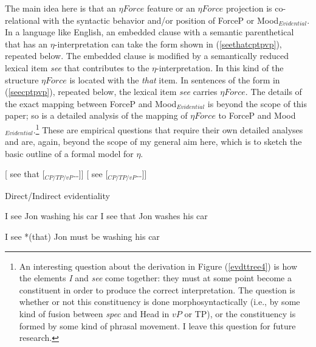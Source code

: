 \documentclass{article}
\begin{document}
The main idea here is that an $\eta Force$ feature or an $\eta Force$ projection is co-relational with the syntactic behavior and/or position of ForceP or Mood$_{Evidential}$. In a language like English, an embedded clause with a semantic parenthetical that has an $\eta$-interpretation can take the form shown in (\ref{seethatcptpvp}), repeated below. The embedded clause is modified by a semantically reduced lexical item {\sl see} that contributes to the $\eta$-interpretation. In this kind of the structure $\eta Force$ is located with the {\sl that} item. In sentences of the form in (\ref{seecptpvp}), repeated below, the lexical item {\sl see} carries $\eta Force$. The details of the exact mapping between ForceP and Mood$_{Evidential}$ is beyond the scope of this paper; so is a detailed analysis of the mapping of $\eta Force$ to ForceP and Mood$_{Evidential}$.\footnote{An interesting question about the derivation in Figure (\ref{evdttree4}) is how the elements {\sl I} and  {\sl see} come together: they must at some point become a constituent in order to produce the correct interpretation. The question is whether or not this constituency is done morphosyntactically (i.e., by some kind of fusion between {\sl spec} and Head in $vP$ or TP), or the constituency is formed by some kind of phrasal movement. I leave this question for future research.} These are empirical questions that require their own detailed analyses and are, again, beyond the scope of my general aim here, which is to sketch the basic outline of a formal model for $\eta$.
 

\begin{exe}
\exi {(\ref{seethatcptpvp})} [ see that [$_{CP/TP/vP}$\ldots ]]
\exi {(\ref{seecptpvp})} [ see [$_{CP/TP/vP}$\ldots ]]    
\end{exe}

\begin{exe}
\ex Direct/Indirect evidentiality
\begin{xlist}
\ex I see Jon washing his car
\ex I see that Jon washes his car
\end{xlist}
\ex I see *(that) Jon must be washing his car  
\end{exe}
\end{document}
